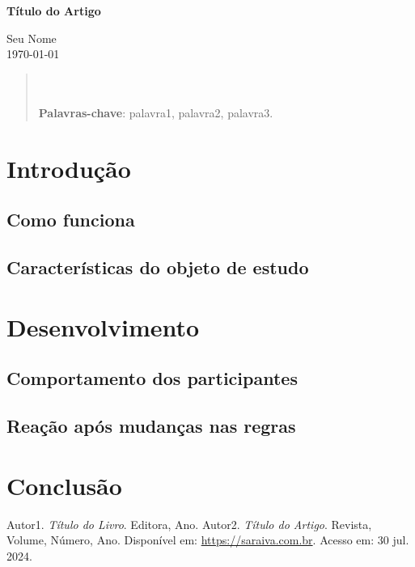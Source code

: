 \documentclass[a4paper,12pt]{article}
\begin{document}
\begin{center}
    \textbf{\huge Título do Artigo} \\[3cm]
\end{center}

\begin{flushright}
    Seu Nome \\[0.5cm]
    \today
\end{flushright}

\begin{abstract}
\noindent
\lipsum[1] \\ \\
\textbf{Palavras-chave}: palavra1, palavra2, palavra3.
\end{abstract}

\newpage

\renewcommand{\contentsname}{\centerline{\textbf{SUMÁRIO}}}
\tableofcontents
\newpage

\section{Introdução}
\lipsum[3-4] %

\subsection{Como funciona}
\lipsum[5-6] 
\cite{ref1}  %

\subsection{Características do objeto de estudo}
\lipsum[7-8]
\cite{ref1}

\section{Desenvolvimento}
\lipsum[9-10]
\cite{ref2}

\subsection{Comportamento dos participantes}
\lipsum[11-12]

\subsection{Reação após mudanças nas regras}
\lipsum[13-14]

\newpage

\section{Conclusão}
\lipsum[15-16]

\newpage

\begin{thebibliography}{9} %
     Autor1. \textit{Título do Livro}. Editora, Ano.
     Autor2. \textit{Título do Artigo}. Revista, Volume, Número, Ano. Disponível em: \url{https://saraiva.com.br}. Acesso em: 30 jul. 2024.
\end{thebibliography}
\end{document}
